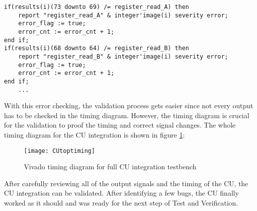  \begin{lstlisting}[style=vhdl, caption=CU top testbench output validation]
if(results(i)(73 downto 69) /= register_read_A) then
	report "register_read_A" & integer'image(i) severity error;
	error_flag := true;
	error_cnt := error_cnt + 1;
end if;  
if(results(i)(68 downto 64) /= register_read_B) then
	report "register_read_B" & integer'image(i) severity error;
	error_flag := true;
	error_cnt := error_cnt + 1;
end if;  
 	...
 \end{lstlisting}
With this error checking, the validation process gets easier since not every output has to be checked in the timing diagram. However, the timing diagram is crucial for the validation to proof the timing and correct signal changes. The whole timing diagram for the CU integration is shown in figure \ref{fig:cutoptiming}:
\begin{figure}[H]
	\centering
	\texttt{[image: CUtoptiming]}
	\caption{Vivado timing diagram for full CU integration testbench}
	\label{fig:cutoptiming}
\end{figure}
After carefully reviewing all of the output signals and the timing of the CU, the CU integration can be validated. After identifying a few bugs, the CU finally worked as it should and was ready for the next step of Test and Verification.


